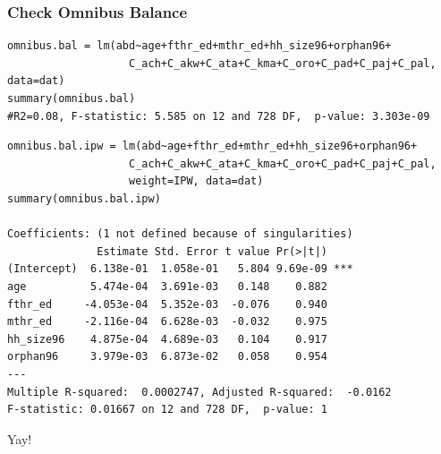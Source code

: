 \documentclass[xcolor=dvipsnames]{beamer}
\begin{document}
\begin{frame}[fragile]
\frametitle{Check Omnibus Balance}
\tiny
\begin{verbatim}
omnibus.bal = lm(abd~age+fthr_ed+mthr_ed+hh_size96+orphan96+
                   C_ach+C_akw+C_ata+C_kma+C_oro+C_pad+C_paj+C_pal, data=dat) 
summary(omnibus.bal) 
#R2=0.08, F-statistic: 5.585 on 12 and 728 DF,  p-value: 3.303e-09
\end{verbatim}
\begin{verbatim}
omnibus.bal.ipw = lm(abd~age+fthr_ed+mthr_ed+hh_size96+orphan96+
                   C_ach+C_akw+C_ata+C_kma+C_oro+C_pad+C_paj+C_pal, 
                   weight=IPW, data=dat) 
summary(omnibus.bal.ipw)

Coefficients: (1 not defined because of singularities)
              Estimate Std. Error t value Pr(>|t|)    
(Intercept)  6.138e-01  1.058e-01   5.804 9.69e-09 ***
age          5.474e-04  3.691e-03   0.148    0.882    
fthr_ed     -4.053e-04  5.352e-03  -0.076    0.940    
mthr_ed     -2.116e-04  6.628e-03  -0.032    0.975    
hh_size96    4.875e-04  4.689e-03   0.104    0.917    
orphan96     3.979e-03  6.873e-02   0.058    0.954    
---
Multiple R-squared:  0.0002747,	Adjusted R-squared:  -0.0162 
F-statistic: 0.01667 on 12 and 728 DF,  p-value: 1
\end{verbatim}
\normalsize
\begin{center}
Yay!
\end{center}
\end{frame}
\end{document}
